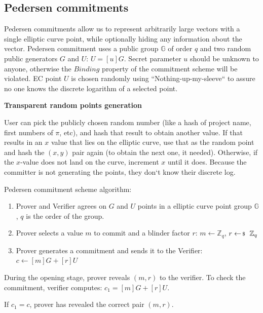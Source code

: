 \documentclass[../lecture-notes-148x210.tex]{subfiles}
\begin{document}
\subsection{Pedersen commitments}

Pedersen commitments \cite{pedersen1991} allow us to represent arbitrarily large vectors with a single elliptic curve point, while optionally hiding any information about the vector. Pedersen commitment uses a public group $\mathbb{G}$ of order $q$ and two random public generators $G$ and $U$: $U = [u]G$. Secret parameter $u$ should be unknown to anyone, otherwise the $\textit{Binding}$ property of the commitment scheme will be violated.
EC point $U$ is chosen randomly using ``Nothing-up-my-sleeve`` to assure no one knows the discrete logarithm of a selected point.

\begin{remark}
    \textbf{Transparent random points generation}

    User can pick the publicly chosen random number (like a hash of project name, first numbers of $\pi$, etc), and hash that result to obtain another value. If that results in an $x$ value that lies on the elliptic curve, use that as the random point and hash the $(x, y)$ pair again (to obtain the next one, it needed). Otherwise, if the $x$-value does not land on the curve, increment $x$ until it does. Because the committer is not generating the points, they don`t know their discrete log. 
\end{remark}

Pedersen commitment scheme algorithm:
\begin{enumerate}
    \item Prover and Verifier agrees on $G$ and $U$ points in a elliptic curve point group $\mathbb{G}$, $q$ is the order of the group.
    \item Prover selects a value $m$ to commit and a blinder factor $r$:
            $m \leftarrow \mathbb{Z}_q$,
            $r \leftarrowS \mathbb{Z}_q$
    \item Prover generates a commitment and sends it to the Verifier:
            $c \gets [m]G + [r]U$
\end{enumerate}

During the opening stage, prover reveals $(m, r)$ to the verifier. 
To check the commitment, verifier computes: $c_1 = [m]G + [r]U$.

If $c_1 = c$, prover has revealed the correct pair $(m, r)$.
\end{document}
